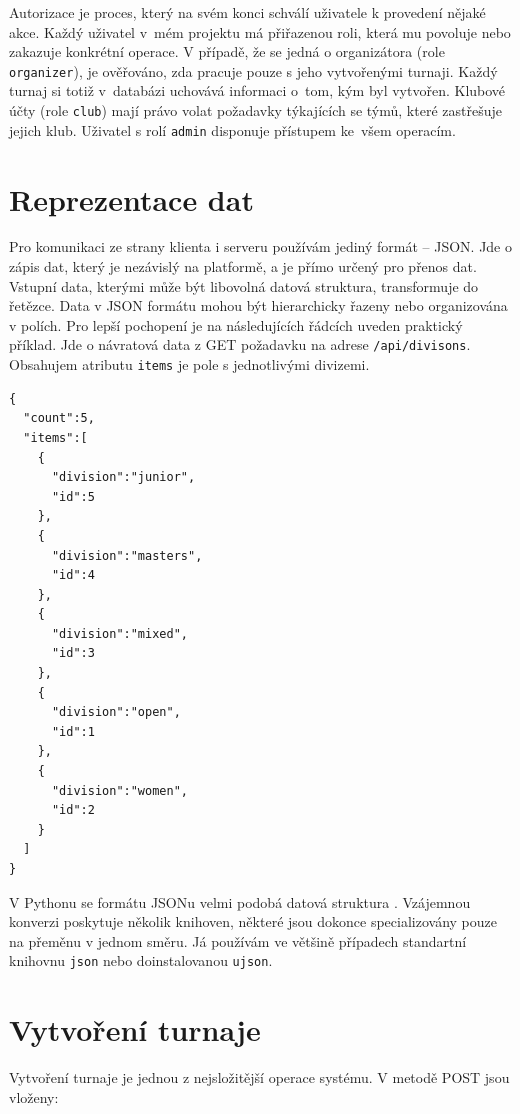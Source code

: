 Autorizace je proces, který na svém konci schválí uživatele k provedení nějaké akce. Každý uživatel
v~mém projektu má přiřazenou roli, která mu povoluje nebo zakazuje konkrétní operace. V případě, že
se jedná o organizátora (role \texttt{organizer}), je ověřováno, zda pracuje pouze s jeho vytvořenými turnaji.
Každý turnaj si totiž v~databázi uchovává informaci o~tom, kým byl vytvořen. Klubové účty
(role \texttt{club}) mají právo volat požadavky týkajících se týmů, které zastřešuje jejich klub.
Uživatel s rolí \texttt{admin} disponuje přístupem ke~všem operacím.

\section{Reprezentace dat}

Pro komunikaci ze strany klienta i serveru používám jediný formát -- JSON.
Jde o zápis dat, který je nezávislý na platformě, a je přímo určený pro přenos dat.
Vstupní data, kterými může být libovolná datová struktura, transformuje do řetězce.
Data v JSON formátu mohou být hierarchicky řazeny nebo organizována v polích.
Pro lepší pochopení je na následujících řádcích uveden praktický příklad.
Jde o návratová data z GET požadavku na adrese \texttt{/api/divisons}.
Obsahujem atributu \texttt{items} je pole s jednotlivými divizemi.

\begingroup
\fontsize{9.5pt}{11pt}\selectfont
\begin{lstlisting}[basicstyle=\small,style=json]
 {
  "count":5,
  "items":[
    {
      "division":"junior",
      "id":5
    },
    {
      "division":"masters",
      "id":4
    },
    {
      "division":"mixed",
      "id":3
    },
    {
      "division":"open",
      "id":1
    },
    {
      "division":"women",
      "id":2
    }
  ]
}
\end{lstlisting}
\endgroup

V Pythonu se formátu JSONu velmi podobá datová struktura \cite{python_dict}.
Vzájemnou konverzi poskytuje několik knihoven, některé jsou dokonce specializovány pouze na přeměnu v jednom směru.
Já používám ve většině případech standartní knihovnu \texttt{json}\cite{python_json}
nebo doinstalovanou \texttt{ujson}\cite{python_ujson}.

\section{Vytvoření turnaje}

Vytvoření turnaje je jednou z nejsložitější operace systému. V metodě POST jsou vloženy:

